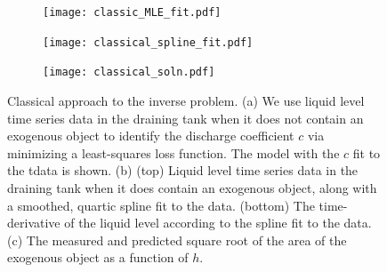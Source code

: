 \documentclass[a4paper,fleqn]{cas-sc}
\begin{document}
\begin{figure}[h!]
	\centering
	\begin{subfigure}[b]{0.5\textwidth}
		\texttt{[image: classic\_MLE\_fit.pdf]} \caption{} \label{fig:mle}
	\end{subfigure}
	
	 \begin{subfigure}[b]{0.525\textwidth}
		\texttt{[image: classical\_spline\_fit.pdf]} \caption{} \label{fig:spline_fit}
	\end{subfigure}
	\begin{subfigure}[b]{0.4\textwidth}
		\texttt{[image: classical\_soln.pdf]} \caption{} \label{fig:classical_soln}
	\end{subfigure}
	\caption{Classical approach to the inverse problem.
	(a) We use liquid level time series data in the draining tank when it does not contain an exogenous object to identify the discharge coefficient $c$ via minimizing a least-squares loss function. The model with the $c$ fit to the tdata is shown.
	(b) (top) Liquid level time series data in the draining tank when it does contain an exogenous object, along with a smoothed, quartic spline fit to the data. (bottom) The time-derivative of the liquid level according to the spline fit to the data. 
	(c) The measured and predicted square root of the area of the exogenous object as a function of $h$.
	}
\end{figure}



\clearpage



 
\end{document}
